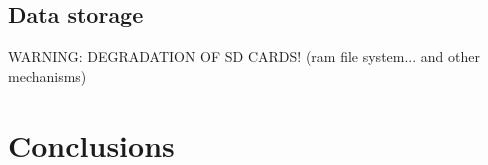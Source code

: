 \documentclass[printmode]{mgr}
\begin{document}
\section{Data storage}
WARNING: DEGRADATION OF SD CARDS! (ram file system... and other mechanisms)

\chapter{Conclusions}
\label{chapter:conclusions}



\listoffigures
\listoftables
\end{document}
